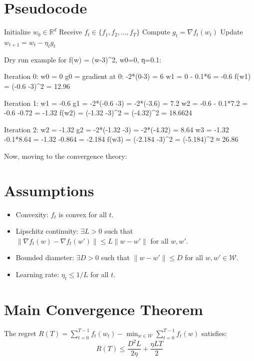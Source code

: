 \documentclass{article}
\begin{document}
\section*{Pseudocode}
\begin{algorithm}[H]
  \caption{Online Gradient Descent (OGD)}
  \begin{algorithmic}[1]
    \State Initialize \( w_0 \in \mathbb{R}^d \)
      \State Receive \( f_t \in \{ f_1, f_2, \ldots, f_T \} \)
      \State Compute \( g_t = \nabla f_t(w_t) \)
      \State Update \( w_{t+1} = w_t - \eta_t g_t \)
    \EndFor
  \end{algorithmic}
\end{algorithm}

Dry run example for f(w) = (w-3)^2, w0=0, η=0.1:

Iteration 0:
w0 = 0
g0 = gradient at 0: -2*(0-3) = 6
w1 = 0 - 0.1*6 = -0.6
f(w1) = (-0.6 -3)^2 = 12.96

Iteration 1:
w1 = -0.6
g1 = -2*(-0.6 -3) = -2*(-3.6) = 7.2
w2 = -0.6 - 0.1*7.2 = -0.6 -0.72 = -1.32
f(w2) = (-1.32 -3)^2 = (-4.32)^2 = 18.6624

Iteration 2:
w2 = -1.32
g2 = -2*(-1.32 -3) = -2*(-4.32) = 8.64
w3 = -1.32 -0.1*8.64 = -1.32 -0.864 = -2.184
f(w3) = (-2.184 -3)^2 = (-5.184)^2 ≈ 26.86

Now, moving to the convergence theory:

\section*{Assumptions}
\begin{itemize}
  \item Convexity: \( f_t \) is convex for all \( t \).
  \item Lipschitz continuity: \( \exists L > 0 \) such that \( \|\nabla f_t(w) - \nabla f_t(w')\| \leq L \| w - w' \| \) for all \( w, w' \).
  \item Bounded diameter: \( \exists D > 0 \) such that \( \| w - w' \| \leq D \) for all \( w, w' \in \mathcal{W} \).
  \item Learning rate: \( \eta_t \leq 1/L \) for all \( t \).
\end{itemize}

\section*{Main Convergence Theorem}
The regret \( R(T) = \sum_{t=0}^{T-1} f_t(w_t) - \min_{w \in \mathcal{W}} \sum_{t=0}^{T-1} f_t(w) \) satisfies:
\[ R(T) \leq \frac{D^2 L}{2 \eta} + \frac{\eta L T}{2} \]
\end{document}
